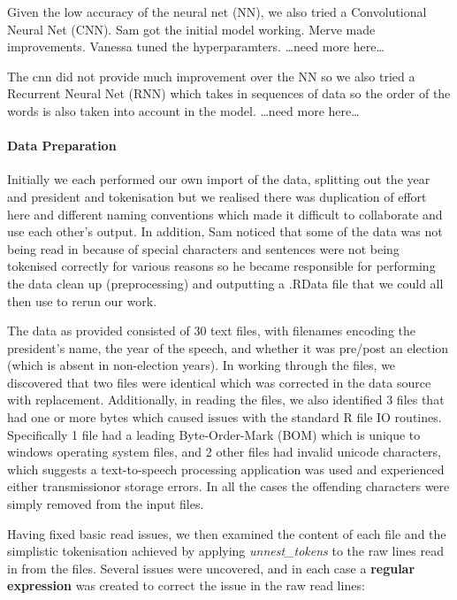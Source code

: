 \documentclass[]{article}
\let\oldparagraph\paragraph
\renewcommand{\paragraph}[1]{\oldparagraph{#1}\mbox{}}
\begin{document}
Given the low accuracy of the neural net (NN), we also tried a
Convolutional Neural Net (CNN). Sam got the initial model working. Merve
made improvements. Vanessa tuned the hyperparamters. \ldots{}need more
here\ldots{}

The cnn did not provide much improvement over the NN so we also tried a
Recurrent Neural Net (RNN) which takes in sequences of data so the order
of the words is also taken into account in the model. \ldots{}need more
here\ldots{}

\hypertarget{data-preparation}{%
\paragraph{Data Preparation}\label{data-preparation}}

Initially we each performed our own import of the data, splitting out
the year and president and tokenisation but we realised there was
duplication of effort here and different naming conventions which made
it difficult to collaborate and use each other's output. In addition,
Sam noticed that some of the data was not being read in because of
special characters and sentences were not being tokenised correctly for
various reasons so he became responsible for performing the data clean
up (preprocessing) and outputting a .RData file that we could all then
use to rerun our work.

The data as provided consisted of 30 text files, with filenames encoding
the president's name, the year of the speech, and whether it was
pre/post an election (which is absent in non-election years). In working
through the files, we discovered that two files were identical which was
corrected in the data source with replacement. Additionally, in reading
the files, we also identified 3 files that had one or more bytes which
caused issues with the standard R file IO routines. Specifically 1 file
had a leading Byte-Order-Mark (BOM) which is unique to windows operating
system files, and 2 other files had invalid unicode characters, which
suggests a text-to-speech processing application was used and
experienced either transmissionor storage errors. In all the cases the
offending characters were simply removed from the input files.

Having fixed basic read issues, we then examined the content of each
file and the simplistic tokenisation achieved by applying
\emph{unnest\_tokens} to the raw lines read in from the files. Several
issues were uncovered, and in each case a \textbf{regular expression}
was created to correct the issue in the raw read lines:
\end{document}

